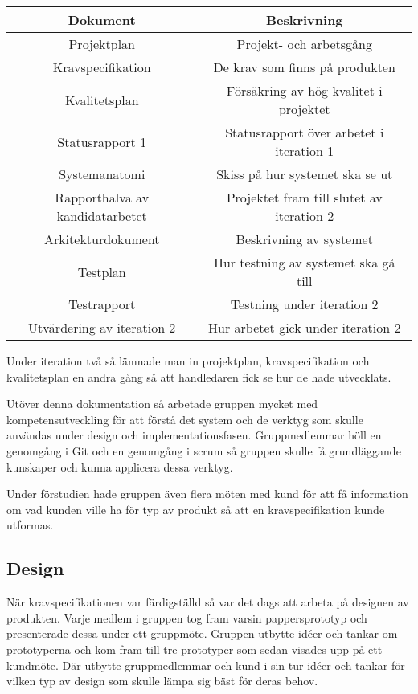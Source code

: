 \documentclass[a4paper,10pt]{article}
\begin{document}
\begin{center}
\begin{tabular}{|c|c|}
\hline
\textbf{Dokument} & \textbf{Beskrivning} \\
\hline
Projektplan & Projekt- och arbetsgång \\
\hline
Kravspecifikation & De krav som finns på produkten \\
\hline
Kvalitetsplan & Försäkring av hög kvalitet i projektet \\
\hline
Statusrapport 1 & Statusrapport över arbetet i iteration 1 \\
\hline
Systemanatomi & Skiss på hur systemet ska se ut \\
\hline
Rapporthalva av kandidatarbetet & Projektet fram till slutet av iteration 2 \\
\hline
Arkitekturdokument & Beskrivning av systemet \\
\hline
Testplan & Hur testning av systemet ska gå till \\
\hline
Testrapport & Testning under iteration 2 \\
\hline
Utvärdering av iteration 2 & Hur arbetet gick under iteration 2 \\
\hline
\end{tabular}
\end{center}

Under iteration två så lämnade man in projektplan, kravspecifikation och kvalitetsplan en andra gång så att handledaren fick se hur de hade utvecklats.

Utöver denna dokumentation så arbetade gruppen mycket med kompetensutveckling för att förstå det system och de verktyg som skulle användas under design och implementationsfasen. Gruppmedlemmar höll en genomgång i Git och en genomgång i scrum så gruppen skulle få grundläggande kunskaper och kunna applicera dessa verktyg. 

Under förstudien hade gruppen även flera möten med kund för att få information om vad kunden ville ha för typ av produkt så att en kravspecifikation kunde utformas.

\subsection{Design}
När kravspecifikationen var färdigställd så var det dags att arbeta på designen av produkten. Varje medlem i gruppen tog fram varsin pappersprototyp och presenterade dessa under ett gruppmöte. Gruppen utbytte idéer och tankar om prototyperna och kom fram till tre prototyper som sedan visades upp på ett kundmöte. Där utbytte gruppmedlemmar och kund i sin tur idéer och tankar för vilken typ av design som skulle lämpa sig bäst för deras behov.
\end{document}
